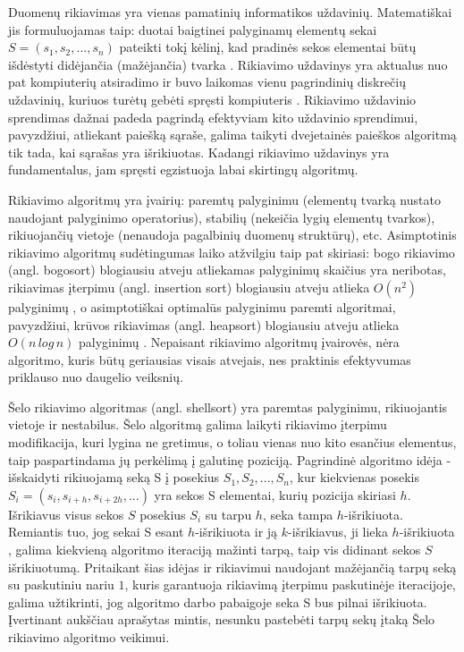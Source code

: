 \documentclass{VUMIFInfKursinis}
\begin{document}
Duomenų rikiavimas yra vienas pamatinių informatikos uždavinių.
Matematiškai jis formuluojamas taip:
duotai baigtinei palyginamų elementų sekai $S = (s_1, s_2, ..., s_n)$ pateikti tokį
kėlinį, kad pradinės sekos elementai būtų išdėstyti didėjančia (mažėjančia) tvarka \cite{Radavičius_Baranauskas_2013}.
Rikiavimo uždavinys yra aktualus nuo pat kompiuterių atsiradimo ir buvo laikomas vienu 
pagrindinių diskrečių uždavinių, kuriuos turėtų gebėti spręsti kompiuteris \cite{10.1145/356580.356581}.
Rikiavimo uždavinio sprendimas dažnai padeda pagrindą efektyviam kito uždavinio sprendimui,
pavyzdžiui, atliekant paiešką sąraše, galima taikyti dvejetainės paieškos algoritmą tik tada,
kai sąrašas yra išrikiuotas.
Kadangi rikiavimo uždavinys yra fundamentalus, jam spręsti egzistuoja labai skirtingų algoritmų.

Rikiavimo algoritmų yra įvairių:
paremtų palyginimu (elementų tvarką nustato naudojant palyginimo operatorius),
stabilių (nekeičia lygių elementų tvarkos),
rikiuojančių vietoje (nenaudoja pagalbinių duomenų struktūrų), etc.
Asimptotinis rikiavimo algoritmų sudėtingumas laiko atžvilgiu taip pat skiriasi:
bogo rikiavimo (angl. bogosort) \cite{10.1007/978-3-540-72914-3_17} blogiausiu atveju atliekamas palyginimų skaičius yra neribotas,
rikiavimas įterpimu (angl. insertion sort) blogiausiu atveju atlieka $O(n^2)$ palyginimų \cite{bender2006insertion},
o asimptotiškai optimalūs palyginimu paremti algoritmai, pavyzdžiui, krūvos rikiavimas (angl. heapsort) \cite{10.1145/512274.512284}
blogiausiu atveju atlieka $O(n\,log\,n)$ palyginimų \cite{SCHAFFER199376}.
Nepaisant rikiavimo algoritmų įvairovės, nėra algoritmo, kuris būtų geriausias visais atvejais,
nes praktinis efektyvumas priklauso nuo daugelio veiksnių.

Šelo rikiavimo algoritmas (angl. shellsort) \cite{10.1145/368370.368387} yra paremtas palyginimu, rikiuojantis vietoje ir nestabilus.
Šelo algoritmą galima laikyti rikiavimo įterpimu modifikacija,
kuri lygina ne gretimus, o toliau vienas nuo kito esančius elementus, taip paspartindama jų perkėlimą į galutinę poziciją.
Pagrindinė algoritmo idėja - išskaidyti rikiuojamą seką S į posekius $S_1, S_2, ..., S_n$,
kur kiekvienas posekis $S_i = (s_i, s_{i+h}, s_{i+2h}, ...)$ yra sekos S elementai, kurių pozicija skiriasi $h$.
Išrikiavus visus sekos $S$ posekius $S_i$ su tarpu $h$, seka tampa $h$-išrikiuota.
Remiantis tuo, jog sekai S esant $h$-išrikiuota ir ją $k$-išrikiavus, ji lieka $h$-išrikiuota \cite{GALE1972103},
galima kiekvieną algoritmo iteraciją mažinti tarpą, taip vis didinant sekos $S$ išrikiuotumą. %
Pritaikant šias idėjas ir rikiavimui naudojant mažėjančią tarpų seką su paskutiniu nariu $1$,
kuris garantuoja rikiavimą įterpimu paskutinėje iteracijoje,
galima užtikrinti, jog algoritmo darbo pabaigoje seka S bus pilnai išrikiuota.
Įvertinant aukščiau aprašytas mintis, nesunku pastebėti tarpų sekų įtaką Šelo rikiavimo algoritmo veikimui.
\end{document}

